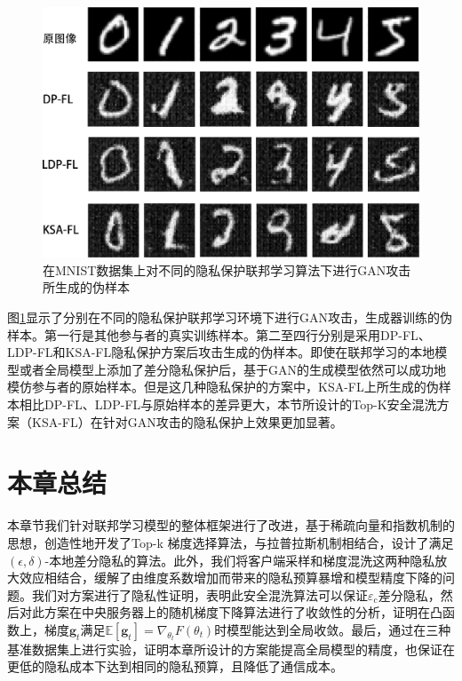 \begin{figure}[!hbt]
\centering
  	\includegraphics[scale=0.03]{fig2/C4/GAN攻击}%
	\caption{在MNIST数据集上对不同的隐私保护联邦学习算法下进行GAN攻击所生成的伪样本}
  	\label{fig:在MNIST数据集上对不同的隐私保护联邦学习算法下进行GAN攻击所生成的伪样本} 
\end{figure}

图\ref{fig:在MNIST数据集上对不同的隐私保护联邦学习算法下进行GAN攻击所生成的伪样本}显示了分别在不同的隐私保护联邦学习环境下进行GAN攻击，生成器训练的伪样本。第一行是其他参与者的真实训练样本。第二至四行分别是采用DP-FL、LDP-FL和KSA-FL隐私保护方案后攻击生成的伪样本。即使在联邦学习的本地模型或者全局模型上添加了差分隐私保护后，基于GAN的生成模型依然可以成功地模仿参与者的原始样本。但是这几种隐私保护的方案中，KSA-FL上所生成的伪样本相比DP-FL、LDP-FL与原始样本的差异更大，本节所设计的Top-K安全混洗方案（KSA-FL）在针对GAN攻击的隐私保护上效果更加显著。


\section{本章总结}
本章节我们针对联邦学习模型的整体框架进行了改进，基于稀疏向量和指数机制的思想，创造性地开发了Top-k 梯度选择算法，与拉普拉斯机制相结合，设计了满足$(\epsilon, \delta)$-本地差分隐私的算法。此外，我们将客户端采样和梯度混洗这两种隐私放大效应相结合，缓解了由维度系数增加而带来的隐私预算暴增和模型精度下降的问题。我们对方案进行了隐私性证明，表明此安全混洗算法可以保证$\varepsilon_{\mathrm{c}}$差分隐私，然后对此方案在中央服务器上的随机梯度下降算法进行了收敛性的分析，证明在凸函数上，梯度$\mathbf{g}_{t}$满足$\mathbb{E}\left[\mathbf{g}_{t}\right]=\nabla_{\theta_{t}} F\left(\theta_{t}\right)$时模型能达到全局收敛。最后，通过在三种基准数据集上进行实验，证明本章所设计的方案能提高全局模型的精度，也保证在更低的隐私成本下达到相同的隐私预算，且降低了通信成本。



